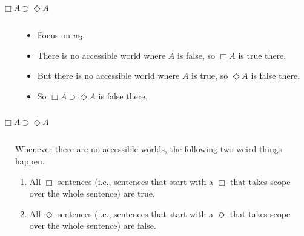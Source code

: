 \documentclass[
  14pt,
  letterpaper,
  ignorenonframetext,
  aspectratio=169,
]{beamer}
\begin{document}
\begin{frame}{\(\Box A \supset \Diamond A\)}
\protect\hypertarget{box-a-supset-diamond-a}{}
\begin{columns}
    \begin{column}{0.45\textwidth}
    \end{column}
    \begin{column}{0.5\textwidth}
    \begin{itemize}
    \item Focus on $w_3$.
    \item There is no accessible world where $A$ is false, so $\Box A$ is true there.
    \item But there is no accessible world where $A$ is true, so $\Diamond A$ is false there.
    \item So $\Box A \supset \Diamond A$ is false there.
    \end{itemize}
\end{column}
\end{columns}
\end{frame}

\begin{frame}{\(\Box A \supset \Diamond A\)}
\protect\hypertarget{box-a-supset-diamond-a-1}{}
\begin{columns}
    \begin{column}{0.45\textwidth}
    \end{column}
    \begin{column}{0.5\textwidth}
    Whenever there are no accessible worlds, the following two weird things happen.
    \begin{enumerate}
    \item All $\Box$-sentences (i.e., sentences that start with a $\Box$ that takes scope over the whole sentence) are true.
    \item All $\Diamond$-sentences (i.e., sentences that start with a $\Diamond$ that takes scope over the whole sentence) are false.
    \end{enumerate}
   \end{column}
\end{columns}
\end{frame}
\end{document}
